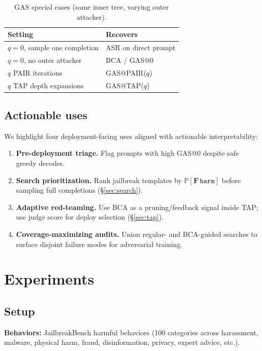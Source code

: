 \documentclass{article}
\newcommand{\Prob}{\mathbb{P}}
\newcommand{\harm}{\texttt{harm}}
\newcommand{\BCA}{\textsc{BCA}}
\newcommand{\ASR}{\textsc{ASR}}
\newcommand{\GAS}{\textsc{GAS}}
\begin{document}
\begin{table}[t]
\centering
\small
\caption{\GAS{} special cases (same inner tree, varying outer attacker).}
\label{tab:gas-special}
\begin{tabular}{ll}
\toprule
Setting & Recovers \\
\midrule
$q{=}0$, sample one completion & \ASR{} on direct prompt \\
$q{=}0$, no outer attacker & \BCA{} / \GAS{}@0 \\
$q$ PAIR iterations & \GAS{}@PAIR($q$) \\
$q$ \textsc{TAP} depth expansions & \GAS{}@TAP($q$) \\
\bottomrule
\end{tabular}
\end{table}

\subsection{Actionable uses}

We highlight four deployment-facing uses aligned with actionable interpretability:

\begin{enumerate}[leftmargin=*,itemsep=1pt]
  \item \textbf{Pre-deployment triage.} Flag prompts with high \GAS{}@0 despite safe greedy decodes.
  \item \textbf{Search prioritization.} Rank jailbreak templates by $\Prob[\mathbf{F}\,\harm]$ before sampling full completions (\S\ref{sec:search}).
  \item \textbf{Adaptive red-teaming.} Use \BCA{} as a pruning/feedback signal inside \textsc{TAP}; use judge score for deploy selection (\S\ref{sec:tap}).
  \item \textbf{Coverage-maximizing audits.} Union regular- and \BCA{}-guided searches to surface disjoint failure modes for adversarial training.
\end{enumerate}

\section{Experiments}
\label{sec:experiments}

\subsection{Setup}

\textbf{Behaviors:} JailbreakBench harmful behaviors (100 categories across harassment, malware, physical harm, fraud, disinformation, privacy, expert advice, etc.).
\end{document}
